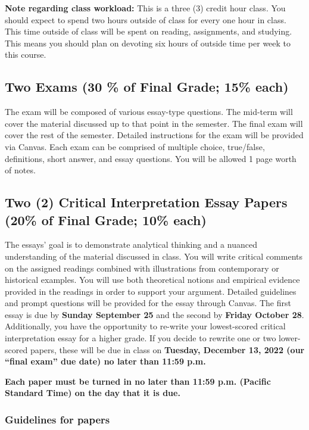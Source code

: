 \documentclass[11pt,]{article}
\begin{document}
\textbf{Note regarding class workload:} This is a three (3) credit hour
class. You should expect to spend two hours outside of class for every
one hour in class. This time outside of class will be spent on reading,
assignments, and studying. This means you should plan on devoting six
hours of outside time per week to this course.

\hypertarget{two-exams-30-of-final-grade-15-each}{%
\subsection{Two Exams (30 \% of Final Grade; 15\%
each)}\label{two-exams-30-of-final-grade-15-each}}

The exam will be composed of various essay-type questions. The mid-term
will cover the material discussed up to that point in the semester. The
final exam will cover the rest of the semester. Detailed instructions
for the exam will be provided via Canvas. Each exam can be comprised of
multiple choice, true/false, definitions, short answer, and essay
questions. You will be allowed 1 page worth of notes.

\hypertarget{writing_assignments}{%
\subsection{Two (2) Critical Interpretation Essay Papers (20\% of Final
Grade; 10\% each)}\label{writing_assignments}}

The essays' goal is to demonstrate analytical thinking and a nuanced
understanding of the material discussed in class. You will write
critical comments on the assigned readings combined with illustrations
from contemporary or historical examples. You will use both theoretical
notions and empirical evidence provided in the readings in order to
support your argument. Detailed guidelines and prompt questions will be
provided for the essay through Canvas. The first essay is due by
\textbf{Sunday September 25} and the second by \textbf{Friday October
28}. Additionally, you have the opportunity to re-write your
lowest-scored critical interpretation essay for a higher grade. If you
decide to rewrite one or two lower-scored papers, these will be due in
class on \textbf{Tuesday, December 13, 2022 (our ``final exam'' due
date) no later than 11:59 p.m.}

\textbf{Each paper must be turned in no later than 11:59 p.m. (Pacific
Standard Time) on the day that it is due.}

\hypertarget{guidelines-for-papers}{%
\subsubsection{Guidelines for papers}\label{guidelines-for-papers}}
\end{document}
